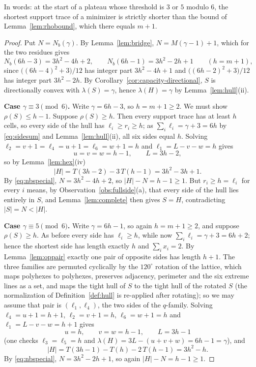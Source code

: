 \documentclass[11pt]{article}
\theoremstyle{plain}
\theoremstyle{definition}
\theoremstyle{remark}
\begin{document}
In words: at the start of a plateau whose threshold is \(3\) or \(5\) modulo \(6\), the
shortest support trace of a minimizer is strictly shorter than the bound of
Lemma~\ref{lem:rhobound}, which there equals \(m+1\).

\begin{proof}
Put \(N=N_{b}(\gamma)\). By Lemma~\ref{lem:bridge}, \(N=M(\gamma-1)+1\), which for the two
residues gives
\begin{equation}\label{eq:nbspecial}
   N_{b}(6h-3)=3h^{2}-4h+2,\qquad N_{b}(6h-1)=3h^{2}-2h+1\qquad(h=m+1),
\end{equation}
since \(\bigl((6h-4)^{2}+3\bigr)/12\) has integer part \(3h^{2}-4h+1\) and
\(\bigl((6h-2)^{2}+3\bigr)/12\) has integer part \(3h^{2}-2h\). By
Corollary~\ref{cor:capacity-directional}, \(S\) is directionally convex with \(\lambda(S)=\gamma\),
hence \(\lambda(H)=\gamma\) by Lemma~\ref{lem:hull}(ii).

\medskip\noindent\textbf{Case \(\gamma\equiv3\pmod6\).} Write \(\gamma=6h-3\), so
\(h=m+1\ge2\). We must show \(\rho(S)\le h-1\). Suppose \(\rho(S)\ge h\). Then every
support trace has at least \(h\) cells, so every side of the hull has \(\ell_{i}\ge r_{i}\ge h\);
as \(\sum_{i}\ell_{i}=\gamma+3=6h\) by \eqref{eq:sidesum} and Lemma~\ref{lem:hull}(ii), all
six sides equal \(h\). Solving
\(\ell_{2}=v+1=\ell_{4}=u+1=\ell_{6}=w+1=h\) and \(\ell_{1}=L-v-w=h\) gives
\[
   u=v=w=h-1,\qquad L=3h-2,
\]
so by Lemma~\ref{lem:hex}(iv)
\[
   |H|=T(3h-2)-3\,T(h-1)=3h^{2}-3h+1 .
\]
By \eqref{eq:nbspecial}, \(N=3h^{2}-4h+2\), so \(|H|-N=h-1\ge1\). But \(r_{i}\ge h=\ell_{i}\)
for every \(i\) means, by Observation~\ref{obs:fullside}(a), that every side of the hull
lies entirely in \(S\), and Lemma~\ref{lem:complete} then gives \(S=H\), contradicting
\(|S|=N<|H|\).

\medskip\noindent\textbf{Case \(\gamma\equiv5\pmod6\).} Write \(\gamma=6h-1\), so again
\(h=m+1\ge2\), and suppose \(\rho(S)\ge h\). As before every side has \(\ell_{i}\ge h\), while
now \(\sum_{i}\ell_{i}=\gamma+3=6h+2\); hence the shortest side has length exactly \(h\) and
\(\sum_{i}x_{i}=2\). By Lemma~\ref{lem:oppair}
exactly one pair of opposite sides has length \(h+1\). The three families are permuted
cyclically by the \(120^{\circ}\) rotation of the lattice, which maps polyhexes to
polyhexes, preserves adjacency, perimeter and the six extreme lines as a set, and maps the
tight hull of \(S\) to the tight hull of the rotated \(S\) (the normalization of
Definition~\ref{def:hull} is re-applied after rotating); so we may assume that pair is
\((\ell_{1},\ell_{4})\), the two sides of the \(q\)-family. Solving
\(\ell_{4}=u+1=h+1\), \(\ell_{2}=v+1=h\), \(\ell_{6}=w+1=h\) and \(\ell_{1}=L-v-w=h+1\)
gives
\[
   u=h,\qquad v=w=h-1,\qquad L=3h-1
\]
(one checks \(\ell_{3}=\ell_{5}=h\) and \(\lambda(H)=3L-(u+v+w)=6h-1=\gamma\)), and
\[
   |H|=T(3h-1)-T(h)-2\,T(h-1)=3h^{2}-h .
\]
By \eqref{eq:nbspecial}, \(N=3h^{2}-2h+1\), so again \(|H|-N=h-1\ge1\).


\end{proof}
\end{document}
